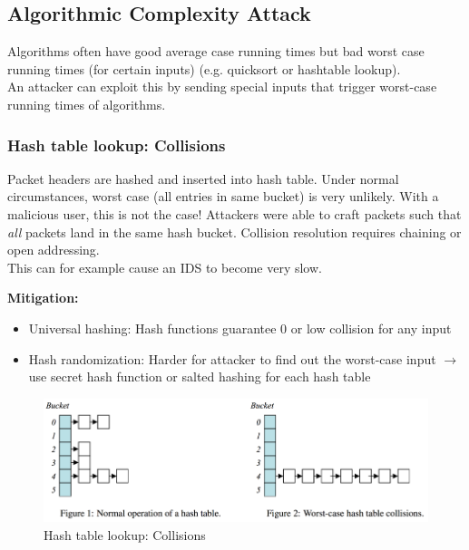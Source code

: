 \documentclass[11pt,oneside,a4paper]{article}
\begin{document}
\subsection{Algorithmic Complexity Attack}

Algorithms often have good average case running times but bad worst case running times (for certain inputs) (e.g. quicksort or hashtable lookup).\\
An attacker can exploit this by sending special inputs that trigger worst-case running times of algorithms.

\subsubsection{Hash table lookup: Collisions}

Packet headers are hashed and inserted into hash table. Under normal circumstances, worst case (all entries in same bucket) is very unlikely. With a malicious user, this is not the case! Attackers were able to craft packets such that \textit{all} packets land in the same hash bucket. Collision resolution requires chaining or open addressing.\\
This can for example cause an IDS to become very slow.

\newpage

\noindent \textbf{Mitigation:}

\vspace{-\topsep}
\begin{itemize}
	\setlength{\itemsep}{0pt}
	\setlength{\parskip}{0pt}
	\item Universal hashing:	Hash functions guarantee 0 or low collision for any input
	\item Hash randomization: Harder for attacker to find out the worst-case input
	\subitem $\rightarrow$ use secret hash function or salted hashing for each hash table
\end{itemize}
\vspace{-\topsep}


\begin{figure}
	\centering
	\includegraphics[width=0.5\linewidth]{figures/ddos_hash_collision}
	\caption{Hash table lookup: Collisions}
	\label{fig:ddoshashcollision}
\end{figure}
\end{document}
